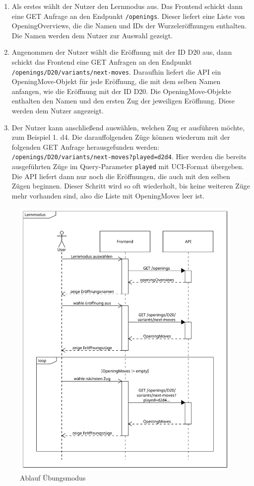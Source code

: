 \begin{enumerate}
     \item Als erstes wählt der Nutzer den Lernmodus aus. Das Frontend schickt dann eine GET Anfrage an den Endpunkt \lstinline{/openings}. Dieser liefert eine Liste von OpeningOverviews, die die Namen und IDs der Wurzeleröffnungen enthalten. Die Namen werden dem Nutzer zur Auswahl gezeigt.
     \item Angenommen der Nutzer wählt die Eröffnung mit der ID D20 aus, dann schickt das Frontend eine GET Anfragen an den Endpunkt \lstinline|/openings/D20/variants/next-moves|. Daraufhin liefert die API ein OpeningMove-Objekt für jede Eröffnung, die mit dem selben Namen anfangen, wie die Eröffnung mit der ID D20. Die OpeningMove-Objekte enthalten den Namen und den ersten Zug der jeweiligen Eröffnung. Diese werden dem Nutzer angezeigt.
     \item Der Nutzer kann anschließend auswählen, welchen Zug er ausführen möchte, zum Beispiel 1. d4. Die darauffolgenden Züge können wiederum mit der folgenden GET Anfrage herausgefunden werden: \lstinline|/openings/D20/variants/next-moves?played=d2d4|. Hier werden die bereits ausgeführten Züge im Query-Parameter \lstinline{played} mit \ac{UCI}-Format übergeben. Die API liefert dann nur noch die Eröffnungen, die auch mit den selben Zügen beginnen. Dieser Schritt wird so oft wiederholt, bis keine weiteren Züge mehr vorhanden sind, also die Liste mit OpeningMoves leer ist.
\end{enumerate}

\begin{figure}[p]
    \includegraphics[width=\linewidth]{images/diagrams/sd_opening_training}
    \caption{Ablauf Übungsmodus}
    \label{fig:sd_opening_training}
\end{figure}


